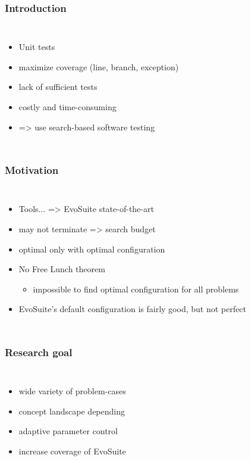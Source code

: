 \begin{frame}
	\frametitle{Introduction}
	
	\begin{columns}[c]
		
		\column{\textwidth}
		\begin{itemize}
			\item Unit tests
			\item maximize coverage (line, branch, exception)
			\item lack of sufficient tests
			\item costly and time-consuming
			\item => use search-based software testing
		\end{itemize}
		
	\end{columns}
	
\end{frame}

\begin{frame}
	\frametitle{Motivation}
	
	\begin{columns}[c]
		
		\column{\textwidth}
		\begin{itemize}
			\item Tools... => EvoSuite state-of-the-art
			\item may not terminate => search budget
			\item optimal only with optimal configuration
			\item No Free Lunch theorem 
				\begin{itemize}
					\item impossible to find optimal configuration for all problems
				\end{itemize}
			\item EvoSuite's default configuration is fairly good, but not perfect
		\end{itemize}
		
	\end{columns}
	
\end{frame}

\begin{frame}
	\frametitle{Research goal}
	
	\begin{columns}[c]
		
		\column{\textwidth}
		\begin{itemize}
			\item wide variety of problem-cases
			\item concept landscape depending 
			\item adaptive parameter control
			\item increase coverage of EvoSuite
		\end{itemize}
		
	\end{columns}
	
\end{frame}

